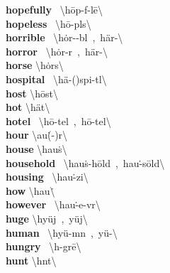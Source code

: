 \documentclass[10pt,a4paper]{article}
\begin{document}
\begin{multicols}{2}
\textbf{ hopefully }\quad \ \textbackslash \textprimstress h\={o}p-f\textschwa -l\={e}\textbackslash \\
\textbf{ hopeless }\quad \ \textbackslash \textprimstress h\={o}-pl\textschwa s\textbackslash \\
\textbf{ horrible }\quad \ \textbackslash \textprimstress h\.{o}r-\textschwa -b\textschwa l\ ,\ \textprimstress h\"{a}r-\textbackslash \\
\textbf{ horror }\quad \ \textbackslash \textprimstress h\.{o}r-\textschwa r\ ,\ \textprimstress h\"{a}r-\textbackslash \\
\textbf{ horse }\quad \textbackslash \textprimstress h\.{o}rs\textbackslash \\
\textbf{ hospital }\quad \ \textbackslash \textprimstress h\"{a}-(\textsecstress )spi-t\textsuperscript{\textreve}l\textbackslash \\
\textbf{ host }\quad \textbackslash \textprimstress h\={o}st\textbackslash \\
\textbf{ hot }\quad \textbackslash \textprimstress h\"{a}t\textbackslash \\
\textbf{ hotel }\quad \ \textbackslash h\={o}-\textprimstress tel\ ,\ \textprimstress h\={o}-\textsecstress tel\textbackslash \\
\textbf{ hour }\quad \textbackslash \textprimstress au\. (-\textschwa )r\textbackslash \\
\textbf{ house }\quad \textbackslash \textprimstress hau\. s\textbackslash \\
\textbf{ household }\quad \ \textbackslash \textprimstress hau\. s-\textsecstress h\={o}ld\ ,\ \textprimstress hau\. -\textsecstress s\={o}ld\textbackslash \\
\textbf{ housing }\quad \ \textbackslash \textprimstress hau\. -zi\engma \textbackslash \\
\textbf{ how }\quad \textbackslash \textprimstress hau\. \textbackslash \\
\textbf{ however }\quad \ \textbackslash hau\. -\textprimstress e-v\textschwa r\textbackslash \\
\textbf{ huge }\quad \textbackslash \textprimstress hy\"{u}j\ ,\ \textprimstress y\"{u}j\textbackslash \\
\textbf{ human }\quad \ \textbackslash \textprimstress hy\"{u}-m\textschwa n\ ,\ \textprimstress y\"{u}-\textbackslash \\
\textbf{ hungry }\quad \ \textbackslash \textprimstress h\textschwa \engma -gr\={e}\textbackslash \\
\textbf{ hunt }\quad \textbackslash \textprimstress h\textschwa nt\textbackslash \\

\end{multicols}
\end{document}
